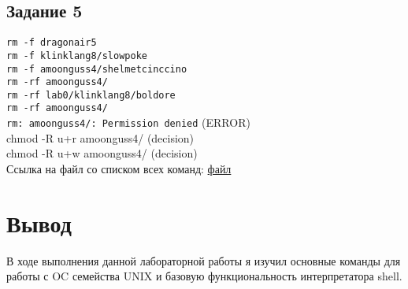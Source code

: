 \subsection*{Задание 5}
\verb|rm -f dragonair5| \\
\verb|rm -f klinklang8/slowpoke| \\
\verb|rm -f amoonguss4/shelmetcinccino| \\
\verb|rm -rf amoonguss4/| \\
\verb|rm -rf lab0/klinklang8/boldore| \\

\noindent \verb|rm -rf amoonguss4/| \\
\verb|rm: amoonguss4/: Permission denied| (ERROR) \\
chmod -R u+r amoonguss4/ (decision) \\
chmod -R u+w amoonguss4/ (decision) \\

\noindent \Large{Ссылка на файл со списком всех команд: \href{https://disk.yandex.ru/d/02RfeRSN2Qf4tA}{файл}}
\normalsize

\section*{Вывод}
В ходе выполнения данной лабораторной работы я изучил основные команды для работы с OC семейства UNIX и базовую функциональность интерпретатора shell. 

 
